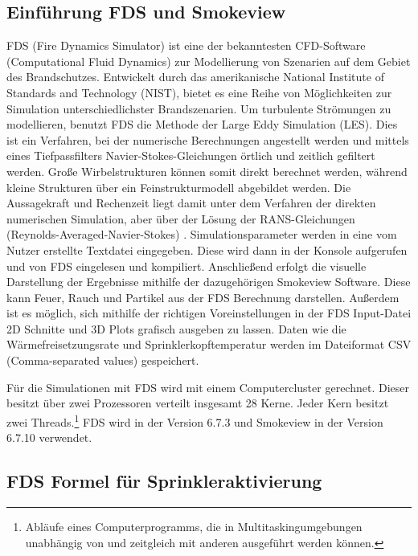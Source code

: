 \subsection{Einführung FDS und Smokeview}
\label{sec:EinfuehrungFDS}

FDS (Fire Dynamics Simulator) \cite{FDSWebsite} ist eine der bekanntesten CFD-Software (Computational Fluid Dynamics) zur Modellierung von Szenarien auf dem Gebiet des Brandschutzes. Entwickelt durch das amerikanische National Institute of Standards and Technology (NIST), bietet es eine Reihe von Möglichkeiten zur Simulation unterschiedlichster Brand\-szenarien. 
Um turbulente Strömungen zu modellieren, benutzt FDS die Methode der Large Eddy Simulation (LES). Dies ist ein Verfahren, bei der numerische Berechnungen angestellt werden und mittels eines Tiefpassfilters Navier-Stokes-Gleichungen örtlich und zeitlich gefiltert werden. Große Wirbelstrukturen können somit direkt berechnet werden, während kleine Strukturen über ein Feinstrukturmodell abgebildet werden. Die Aussagekraft und Rechenzeit liegt damit unter dem Verfahren der direkten numerischen Simulation, aber über der Lösung der RANS-Gleichungen (Reynolds-Averaged-Navier-Stokes) \cite{WikiLES}.
Simulationsparameter werden in eine vom Nutzer erstellte Textdatei eingegeben. Diese wird dann in der Konsole aufgerufen und von FDS eingelesen und kompiliert. Anschließend erfolgt die visuelle Darstellung der Ergebnisse mithilfe der dazugehörigen Smokeview Software. Diese kann Feuer, Rauch und Partikel aus der FDS Berechnung darstellen. Außerdem ist es möglich, sich mithilfe der richtigen Voreinstellungen in der FDS Input-Datei 2D Schnitte und 3D Plots grafisch ausgeben zu lassen. Daten wie \zB die Wärmefreisetzungsrate und Sprinklerkopftemperatur werden im Dateiformat CSV (Comma-separated values) gespeichert.

Für die Simulationen mit FDS wird mit einem Computercluster gerechnet. Dieser besitzt über zwei Prozessoren verteilt insgesamt 28 Kerne. Jeder Kern besitzt zwei Threads.\footnote{Abläufe eines Computerprogramms, die in Multitaskingumgebungen unabhängig von und zeitgleich mit anderen ausgeführt werden können.} FDS wird in der Version 6.7.3 und Smokeview in der Version 6.7.10 verwendet.

\subsection{FDS Formel für Sprinkleraktivierung}
\label{sec:technHintergrund}

